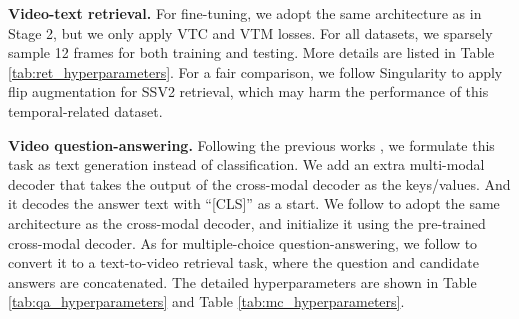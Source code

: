 \documentclass[10pt,twocolumn,letterpaper]{article}
\begin{document}
\textbf{Video-text retrieval.}
For fine-tuning,
we adopt the same architecture as in Stage 2,
but we only apply VTC and VTM losses.
For all datasets,
we sparsely sample 12 frames for both training and testing.
More details are listed in Table \ref{tab:ret_hyperparameters}.
For a fair comparison,
we follow Singularity \cite{lei2022revealing} to apply flip augmentation for SSV2 retrieval,
which may harm the performance of this temporal-related dataset.

\textbf{Video question-answering.}
Following the previous works \cite{lei2022revealing,Cheng2022VindLUAR,li2021align},
we formulate this task as text generation instead of classification.
We add an extra multi-modal decoder that takes the output of the cross-modal decoder as the keys/values.
And it decodes the answer text with ``[CLS]'' as a start.
We follow \cite{lei2022revealing,Cheng2022VindLUAR} to adopt the same architecture as the cross-modal decoder,
and initialize it using the pre-trained cross-modal decoder.
As for multiple-choice question-answering,
we follow \cite{lei2022revealing,li2021align,Cheng2022VindLUAR} to convert it to a text-to-video retrieval task,
where the question and candidate answers are concatenated.
The detailed hyperparameters are shown in Table \ref{tab:qa_hyperparameters} and Table \ref{tab:mc_hyperparameters}.
\end{document}

